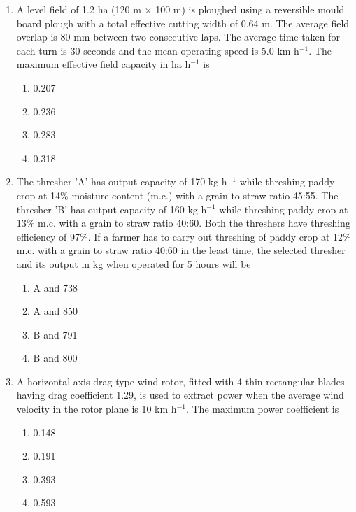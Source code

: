 \documentclass[12pt]{article}
\begin{document}
\begin{enumerate}[label =Q.\arabic*,start=26]
		\item A level field of 1.2 ha (120 m $\times$ 100 m) is ploughed using a reversible mould board plough with a total effective cutting width of 0.64 m. The average field overlap is 80 mm between two consecutive laps. The average time taken for each turn is 30 seconds and the mean operating speed is 5.0 km h$^{-1}$. The maximum effective field capacity in ha h$^{-1}$ is
			\begin{multicols}{4}
				\begin{enumerate}[label=(\Alph*)]
					\item 0.207
					\item 0.236
					\item 0.283
					\item 0.318
				\end{enumerate}
			\end{multicols}

		\item The thresher 'A' has output capacity of 170 kg h$^{-1}$ while threshing paddy crop at 14\% moisture content (m.c.) with a grain to straw ratio 45:55. The thresher 'B' has output capacity of 160 kg h$^{-1}$ while threshing paddy crop at 13\% m.c. with a grain to straw ratio 40:60. Both the threshers have threshing efficiency of 97\%. If a farmer has to carry out threshing of paddy crop at 12\% m.c. with a grain to straw ratio 40:60 in the least time, the selected thresher and its output in kg when operated for 5 hours will be
			\begin{multicols}{4}
				\begin{enumerate}[label=(\Alph*)]
					\item A and 738
					\item A and 850
					\item B and 791
					\item B and 800
				\end{enumerate}
			\end{multicols}

		\item A horizontal axis drag type wind rotor, fitted with 4 thin rectangular blades having drag coefficient 1.29, is used to extract power when the average wind velocity in the rotor plane is 10 km h$^{-1}$. The maximum power coefficient is
			\begin{multicols}{4}
				\begin{enumerate}[label=(\Alph*)]
					\item 0.148
					\item 0.191
					\item 0.393
					\item 0.593
				\end{enumerate}
			\end{multicols}


\end{enumerate}
\end{document}
